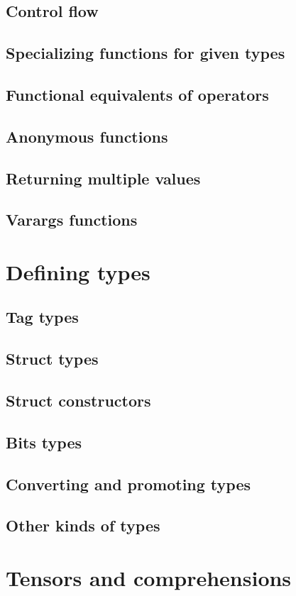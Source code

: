 \documentclass{article}
\begin{document}
\subsection{Control flow}
\subsection{Specializing functions for given types}
\subsection{Functional equivalents of operators}
\subsection{Anonymous functions}
\subsection{Returning multiple values}
\subsection{Varargs functions}
\section{Defining types}
\subsection{Tag types}
\subsection{Struct types}
\subsection{Struct constructors}
\subsection{Bits types}
\subsection{Converting and promoting types}
\subsection{Other kinds of types}
\section{Tensors and comprehensions}
\end{document}
